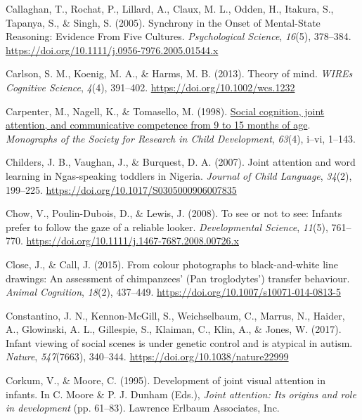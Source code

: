 \documentclass[
]{scrbook}
\newlength{\cslhangindent}
\newenvironment{CSLReferences}[2] %
 {\begin{list}{}{%
  \setlength{\itemindent}{0pt}
  \setlength{\leftmargin}{0pt}
  \setlength{\parsep}{0pt}
  \ifodd #1
   \setlength{\leftmargin}{\cslhangindent}
   \setlength{\itemindent}{-1\cslhangindent}
  \fi
  \setlength{\itemsep}{#2\baselineskip}}}
 {\end{list}}
\begin{document}
\begin{CSLReferences}{1}{0}
Callaghan, T., Rochat, P., Lillard, A., Claux, M. L., Odden, H., Itakura, S., Tapanya, S., \& Singh, S. (2005). Synchrony in the {Onset} of {Mental-State Reasoning}: {Evidence From Five Cultures}. \emph{Psychological Science}, \emph{16}(5), 378--384. \url{https://doi.org/10.1111/j.0956-7976.2005.01544.x}

Carlson, S. M., Koenig, M. A., \& Harms, M. B. (2013). Theory of mind. \emph{WIREs Cognitive Science}, \emph{4}(4), 391--402. \url{https://doi.org/10.1002/wcs.1232}

Carpenter, M., Nagell, K., \& Tomasello, M. (1998). \href{https://www.ncbi.nlm.nih.gov/pubmed/9835078}{Social cognition, joint attention, and communicative competence from 9 to 15 months of age}. \emph{Monographs of the Society for Research in Child Development}, \emph{63}(4), i--vi, 1--143.

Childers, J. B., Vaughan, J., \& Burquest, D. A. (2007). Joint attention and word learning in {Ngas-speaking} toddlers in {Nigeria}. \emph{Journal of Child Language}, \emph{34}(2), 199--225. \url{https://doi.org/10.1017/S0305000906007835}

Chow, V., Poulin-Dubois, D., \& Lewis, J. (2008). To see or not to see: Infants prefer to follow the gaze of a reliable looker. \emph{Developmental Science}, \emph{11}(5), 761--770. \url{https://doi.org/10.1111/j.1467-7687.2008.00726.x}

Close, J., \& Call, J. (2015). From colour photographs to black-and-white line drawings: An assessment of chimpanzees' ({Pan} troglodytes') transfer behaviour. \emph{Animal Cognition}, \emph{18}(2), 437--449. \url{https://doi.org/10.1007/s10071-014-0813-5}

Constantino, J. N., Kennon-McGill, S., Weichselbaum, C., Marrus, N., Haider, A., Glowinski, A. L., Gillespie, S., Klaiman, C., Klin, A., \& Jones, W. (2017). Infant viewing of social scenes is under genetic control and is atypical in autism. \emph{Nature}, \emph{547}(7663), 340--344. \url{https://doi.org/10.1038/nature22999}

Corkum, V., \& Moore, C. (1995). Development of joint visual attention in infants. In C. Moore \& P. J. Dunham (Eds.), \emph{Joint attention: {Its} origins and role in development} (pp. 61--83). Lawrence Erlbaum Associates, Inc.


\end{CSLReferences}
\end{document}
